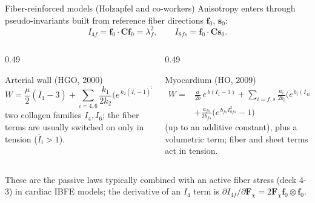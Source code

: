 \documentclass[aspectratio=169,11pt]{beamer}
\newcommand{\Fdef}{\bm{F}_{\chi}}
\newcommand{\Cten}{\bm{C}}
\begin{document}
\begin{frame}{Fiber-reinforced models (Holzapfel and co-workers)}
\footnotesize
Anisotropy enters through pseudo-invariants built from reference fiber directions \(\bm{f}_0\), \(\bm{s}_0\):
\[
  I_{4f}=\bm{f}_0\cdot\Cten\bm{f}_0=\lambda_f^2,
  \qquad
  I_{8fs}=\bm{f}_0\cdot\Cten\bm{s}_0 .
\]
\begin{columns}[T,onlytextwidth]
\begin{column}{0.49\textwidth}
\begin{block}{Arterial wall (HGO, 2000)}
\[
  W=\frac{\mu}{2}(\bar I_1-3)
  +\sum_{i=4,6}\frac{k_1}{2k_2}\Big(e^{\,k_2(\bar I_i-1)^2}-1\Big)
  +U(J),
\]
two collagen families \(I_4,I_6\); the fiber terms are usually switched on only in tension (\(\bar I_i>1\)).
\end{block}
\end{column}
\begin{column}{0.49\textwidth}
\begin{block}{Myocardium (HO, 2009)}
\[
\begin{aligned}
  W={}&\tfrac{a}{2b}\,e^{\,b(I_1-3)}
  +\!\!\sum_{i=f,s}\!\tfrac{a_i}{2b_i}\Big(e^{\,b_i(I_{4i}-1)^2}-1\Big)\\
  &+\tfrac{a_{fs}}{2b_{fs}}\Big(e^{\,b_{fs}I_{8fs}^2}-1\Big)
\end{aligned}
\]
(up to an additive constant), plus a volumetric term; fiber and sheet terms act in tension.
\end{block}
\end{column}
\end{columns}
\medskip
\begin{punchbox}
\small
These are the passive laws typically combined with an active fiber stress (deck 4-3) in cardiac IBFE models; the derivative of an \(I_4\) term is \(\partial I_{4f}/\partial\Fdef=2\Fdef\bm{f}_0\otimes\bm{f}_0\).
\end{punchbox}
\end{frame}
\end{document}
